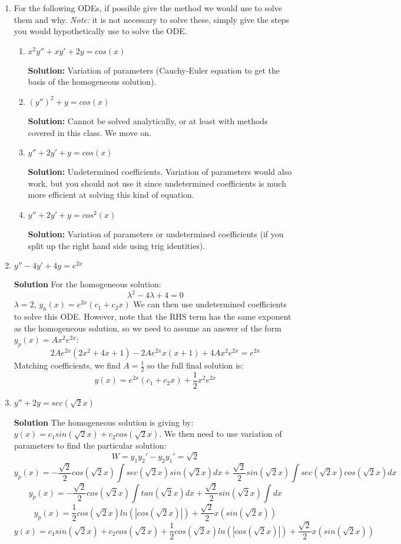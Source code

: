 \documentclass[letterpaper, fontsize=11pt]{scrartcl} %
\numberwithin{equation}{section} %
\numberwithin{figure}{section} %
\numberwithin{table}{section} %
\begin{document}
\begin{enumerate}
\item For the following ODEs, if possible give the method we would use to solve them and why. \textit{Note:} it is not necessary to solve these, simply give the steps you would hypothetically use to solve the ODE. 
\begin{enumerate}
\item $x^2 y'' + xy' + 2y = cos(x)$ \par
\textbf{Solution:} Variation of parameters (Cauchy-Euler equation to get the basis of the homogeneous solution).

\item $(y'')^2 + y = cos(x)$\par 
\textbf{Solution:} Cannot be solved analytically, or at least with methods covered in this class. We move on.

\item $y'' + 2y' + y = cos(x)$ \par
\textbf{Solution:} Undetermined coefficients. Variation of parameters would also work, but you should not use it since undetermined coefficients is much more efficient at solving this kind of equation.

\item $y'' + 2y' + y = cos^2(x)$ \par
\textbf{Solution:} Variation of parameters or undetermined coefficients (if you split up the right hand side using trig identities).

\end{enumerate}
\item $y'' - 4y' +4y = e^{2x}$ \par
\textbf{Solution} \newline
For the homogeneous solution: 
$$\lambda ^2 - 4\lambda +4 = 0$$
$\lambda = 2$, $y_h(x) = e^{2x}(c_1 + c_2x)$ \newline
We can then use undetermined coefficients to solve this ODE. However, note that the RHS term has the same exponent as the homogeneous solution, so we need to assume an answer of the form $y_p(x) = Ax^2e^{2x}$:
$$ 2Ae^{2 x} (2 x^2+4 x+1) - 2 Ae^{2 x} x (x+1) + 4Ax^2e^{2x} = e^{2x}$$
Matching coefficients, we find $ A = \frac{1}{2}$ so the full final solution is:
$$y(x) = e^{2x}(c_1 + c_2x) + \frac{1}{2}x^2e^{2x}$$

\item $y'' + 2y = sec(\sqrt{2}x)$ \par
\textbf{Solution} \newline
The homogeneous solution is giving by: $y(x) = c_1sin(\sqrt{2}x) + c_2cos(\sqrt{2}x)$. We then need to use variation of parameters to find the particular solution: 
$$W = y_1y_2' - y_2y_1' = \sqrt{2}$$
$$y_p(x) = -\frac{\sqrt{2}}{2}cos(\sqrt{2}x) \int sec(\sqrt{2}x)sin(\sqrt{2}x)dx + \frac{\sqrt{2}}{2}sin(\sqrt{2}x) \int sec(\sqrt{2}x)cos(\sqrt{2}x)dx$$
$$y_p(x) = -\frac{\sqrt{2}}{2}cos(\sqrt{2}x) \int tan(\sqrt{2}x)dx + \frac{\sqrt{2}}{2}sin(\sqrt{2}x) \int dx$$
$$y_p(x) = \frac{1}{2}cos(\sqrt{2}x) ln(|cos(\sqrt{2}x)|)+ \frac{\sqrt{2}}{2}x(sin(\sqrt{2}x)) $$
$$y(x) = c_1sin(\sqrt{2}x) + c_2cos(\sqrt{2}x) + \frac{1}{2}cos(\sqrt{2}x) ln(|cos(\sqrt{2}x)|)+ \frac{\sqrt{2}}{2}x(sin(\sqrt{2}x)) $$



\end{enumerate}
\end{document}

